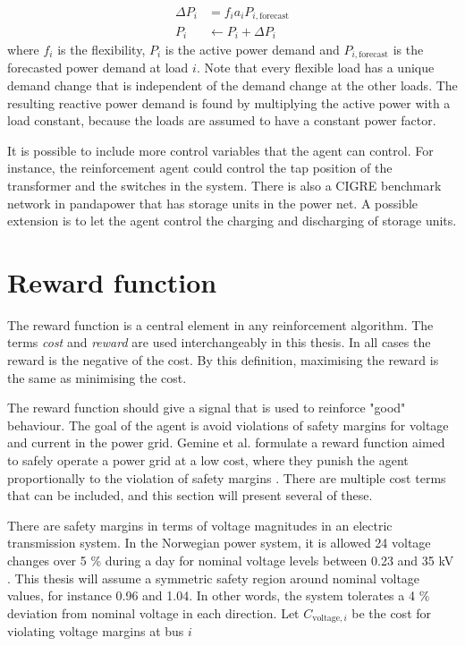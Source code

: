 \documentclass[class=book, crop=false, 11pt]{standalone}
\begin{document}
\begin{equation}
   \begin{aligned}
   \label{eq:problem:update_demand}
    \Delta P_{i}& = f_{i}a_{i}P_{i,\textrm{forecast}} \\
    P_{i}& \leftarrow P_{i} + \Delta P_{i}
    \end{aligned} 
\end{equation}
where $f_{i}$ is the flexibility, $P_{i}$ is the active power demand and $P_{i,\textrm{forecast}}$ is the forecasted power demand at load $i$. Note that every flexible load has a unique demand change that is independent of the demand change at the other loads. The resulting reactive power demand is found by multiplying the active power with a load constant, because the loads are assumed to have a constant power factor.

It is possible to include more control variables that the agent can control. For instance, the reinforcement agent could control the tap position of the transformer and the switches in the system. There is also a CIGRE benchmark network in pandapower that has storage units in the power net. A possible extension is to let the agent control the charging and discharging of storage units.

\section{Reward function}\label{section:reward}
The reward function is a central element in any reinforcement algorithm. The terms \textit{cost} and \textit{reward} are used interchangeably in this thesis. In all cases the reward is the negative of the cost. By this definition, maximising the reward is the same as minimising the cost. 

The reward function should give a signal that is used to reinforce "good" behaviour. The goal of the agent is avoid violations of safety margins for voltage and current in the power grid. Gemine et al. formulate a reward function aimed to safely operate a power grid at a low cost, where they punish the agent proportionally to the violation of safety margins \cite{active_network_management}. There are multiple cost terms that can be included, and this section will present several of these. 

There are safety margins in terms of voltage magnitudes in an electric transmission system. In the Norwegian power system, it is allowed 24 voltage changes over 5 \% during a day for nominal voltage levels between 0.23 and 35 kV \cite{lovdata}. This thesis will assume a symmetric safety region around nominal voltage values, for instance 0.96 and 1.04. In other words, the system tolerates a 4 \% deviation from nominal voltage in each direction. Let $C_{\textrm{voltage},i}$ be the cost for violating voltage margins at bus $i$
\end{document}
